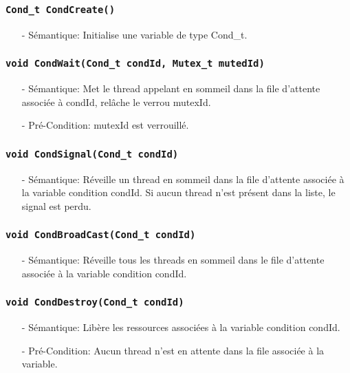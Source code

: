 \documentclass[11pt]{article}
\begin{document}
\subsubsection{\texttt{Cond\_t CondCreate()}}
\begin{itemize}
\item[-]Sémantique: Initialise une variable de type Cond\_t.
\end{itemize}

\subsubsection{\texttt{void CondWait(Cond\_t condId, Mutex\_t mutedId)}}
\begin{itemize}
\item[-]Sémantique: Met le thread appelant en sommeil dans la file d'attente associée à condId,
  relâche le verrou mutexId.
\item[-]Pré-Condition: mutexId est verrouillé.
\end{itemize}

\subsubsection{\texttt{void CondSignal(Cond\_t condId)}}
\begin{itemize}
\item[-]Sémantique: Réveille un thread en sommeil dans la file d'attente associée à la variable
  condition condId. Si aucun thread n'est présent dans la liste, le signal est perdu.
\end{itemize}

\subsubsection{\texttt{void CondBroadCast(Cond\_t condId)}}
\begin{itemize}
\item[-]Sémantique: Réveille tous les threads en sommeil dans le file d'attente associée à la variable
  condition condId.
\end{itemize}

\subsubsection{\texttt{void CondDestroy(Cond\_t condId)}}
\begin{itemize}
\item[-]Sémantique: Libère les ressources associées à la variable condition condId. 
\item[-]Pré-Condition: Aucun thread n'est en attente dans la file associée à la variable.
\end{itemize}
 
\end{document}
